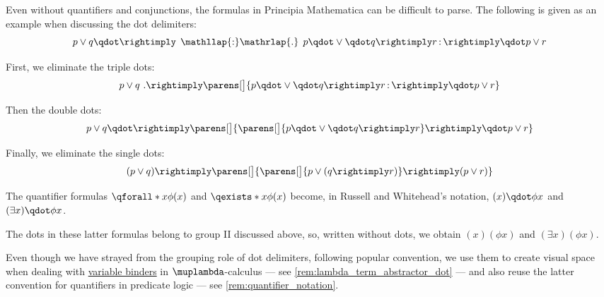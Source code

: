 \begin{example}
\begin{thmenum}
     Even without quantifiers and conjunctions, the formulas in Principia Mathematica can be difficult to parse. The following is given as an example when discussing the dot delimiters:
    \begin{equation}\label{eq:ex:dot_delimiters_in_logic/complicated/principia}
      p \vee q \qdot \rightimply \mathinner{\phantom{:}\mathllap{:}\mathrlap{.}\phantom{.}} p \qdot \vee \qdot q \rightimply r \mathinner{:} \rightimply \qdot p \vee r
    \end{equation}

    First, we eliminate the triple dots:
    \begin{equation}\label{eq:ex:dot_delimiters_in_logic/complicated/principia_without_triple}
      p \vee q \ . \rightimply \parens[\big]{ p \qdot \vee \qdot q \rightimply r \mathinner{:} \rightimply \qdot p \vee r }
    \end{equation}

    Then the double dots:
    \begin{equation}\label{eq:ex:dot_delimiters_in_logic/complicated/principia_without_double}
      p \vee q \qdot \rightimply \parens[\big]{ \parens[\big]{ p \qdot \vee \qdot q \rightimply r } \rightimply \qdot p \vee r }
    \end{equation}

    Finally, we eliminate the single dots:
    \begin{equation}\label{eq:ex:dot_delimiters_in_logic/complicated/plain}
      (p \vee q) \rightimply \parens[\big]{ \parens[\big]{ p \vee (q \rightimply r) } \rightimply (p \vee r) }
    \end{equation}

     The quantifier formulas \( \qforall* x \phi(x) \) and \( \qexists* x \phi(x) \) become, in Russell and Whitehead's notation, \( (x) \qdot \phi x \) and \( (\exists x) \qdot \phi x \).

    The dots in these latter formulas belong to group II discussed above, so, written without dots, we obtain \( (x) (\phi x) \) and \( (\exists x) (\phi x) \).

    Even though we have strayed from the grouping role of dot delimiters, following popular convention, we use them to create visual space when dealing with \hyperref[con:variable_binding]{variable binders} in \( \muplambda \)-calculus --- see \cref{rem:lambda_term_abstractor_dot} --- and also reuse the latter convention for quantifiers in predicate logic --- see \cref{rem:quantifier_notation}.
  \end{thmenum}
\end{example}

